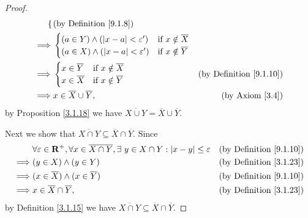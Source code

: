 \begin{proof}
\begin{align*}
\begin{cases}
                   \end{cases}      & \text{(by Definition \ref{9.1.8})}                                               \\
        \implies & \begin{cases}
                       (a \in Y) \land (\left\lvert x - a\right\rvert < \varepsilon') & \text{if } x \notin \overline{X} \\
                       (a \in X) \land (\left\lvert x - a\right\rvert < \varepsilon') & \text{if } x \notin \overline{Y}
                   \end{cases}                                                                               \\
        \implies & \begin{cases}
                       x \in \overline{Y} & \text{if } x \notin \overline{X} \\
                       x \in \overline{X} & \text{if } x \notin \overline{Y}
                   \end{cases}                                                                & \text{(by Definition \ref{9.1.10})}                                              \\
        \implies & x \in \overline{X} \cup \overline{Y},                                                                                   & \text{(by Axiom \ref{3.4})}
    \end{align*}
    by Proposition \ref{3.1.18} we have \(\overline{X \cup Y} = \overline{X} \cup \overline{Y}\).

    Next we show that \(\overline{X \cap Y} \subseteq \overline{X} \cap \overline{Y}\).
    Since
    \begin{align*}
                 & \forall \varepsilon \in \mathbf{R}^+, \forall x \in \overline{X \cap Y}, \exists\ y \in X \cap Y : \left\lvert x - y\right\rvert \leq \varepsilon & \text{(by Definition \ref{9.1.10})} \\
        \implies & (y \in X) \land (y \in Y)                                                                                               & \text{(by Definition \ref{3.1.23})} \\
        \implies & (x \in \overline{X}) \land (x \in \overline{Y})                                                                         & \text{(by Definition \ref{9.1.10})} \\
        \implies & x \in \overline{X} \cap \overline{Y},                                                                                   & \text{(by Definition \ref{3.1.23})}
    \end{align*}
    by Definition \ref{3.1.15} we have \(\overline{X \cap Y} \subseteq \overline{X} \cap \overline{Y}\).


\end{proof}
